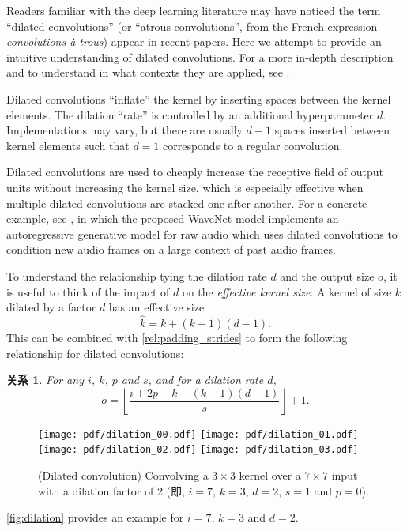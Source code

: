 \documentclass[notitlepage]{ctexrep}
\newtheorem{relationship}{关系}
\begin{document}
Readers familiar with the deep learning literature may have noticed the term
``dilated convolutions'' (or ``atrous convolutions'', from the French expression
{\em convolutions \`{a} trous}) appear in recent papers. Here we attempt to
provide an intuitive understanding of dilated convolutions. For a more in-depth
description and to understand in what contexts they are applied, see
\citet{chen2014semantic,yu2015multi}.

Dilated convolutions ``inflate'' the kernel by inserting spaces between the
kernel elements. The dilation ``rate'' is controlled by an additional
hyperparameter $d$. Implementations may vary, but there are usually $d - 1$
spaces inserted between kernel elements such that $d = 1$ corresponds to a
regular convolution.

Dilated convolutions are used to cheaply increase the receptive field of output
units without increasing the kernel size, which is especially effective
when multiple dilated convolutions are stacked one after another. For a
concrete example, see \citet{oord2016wavenet}, in which the proposed WaveNet
model implements an autoregressive generative model for raw audio which uses
dilated convolutions to condition new audio frames on a large context of past
audio frames.

To understand the relationship tying the dilation rate $d$ and the output size
$o$, it is useful to think of the impact of $d$ on the {\em effective kernel
size}. A kernel of size $k$ dilated by a factor $d$ has an effective size
\begin{equation*}
    \hat{k} = k + (k - 1)(d - 1).
\end{equation*}
This can be combined with \autoref{rel:padding_strides} to form the following
relationship for dilated convolutions:

\begin{relationship}\label{rel:dilation}
For any $i$, $k$, $p$ and $s$, and for a dilation rate $d$,
\begin{equation*}
    o = \left\lfloor \frac{i + 2p - k - (k - 1)(d - 1)}{s} \right\rfloor + 1.
\end{equation*}
\end{relationship}

\begin{figure}[h]
    \centering
    \texttt{[image: pdf/dilation\_00.pdf]}
    \texttt{[image: pdf/dilation\_01.pdf]}
    \texttt{[image: pdf/dilation\_02.pdf]}
    \texttt{[image: pdf/dilation\_03.pdf]}
    \caption{\label{fig:dilation} (Dilated convolution)
        Convolving a $3 \times 3$ kernel over a $7 \times 7$ input with a
        dilation factor of 2 (即, $i = 7$, $k = 3$, $d = 2$, $s = 1$ and
        $p = 0$).}
\end{figure}

\noindent \autoref{fig:dilation} provides an example for $i = 7$, $k = 3$ and
$d = 2$.



\end{document}
